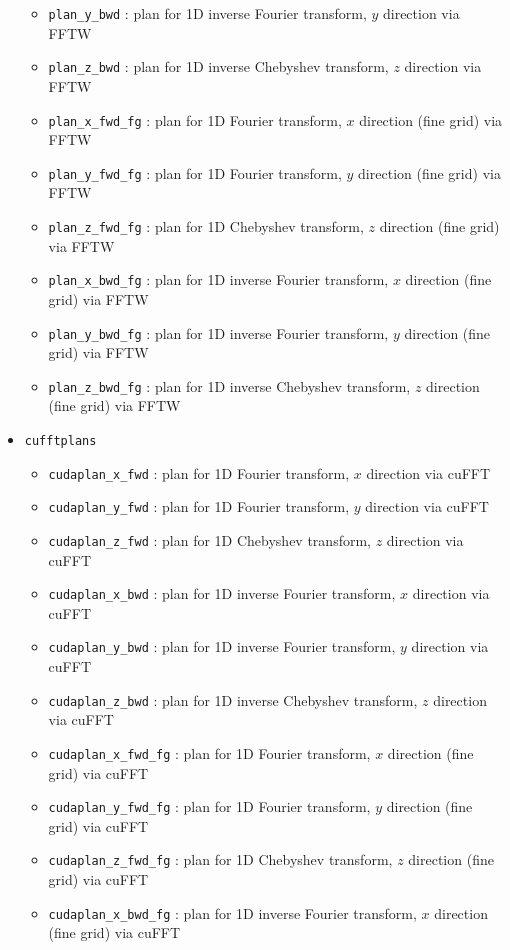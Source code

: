 \begin{itemize}
\begin{itemize}
\item \texttt{plan\_y\_bwd} : plan for 1D inverse Fourier transform, $y$ direction via FFTW
\item \texttt{plan\_z\_bwd} : plan for 1D inverse Chebyshev transform, $z$ direction via FFTW
\item \texttt{plan\_x\_fwd\_fg} : plan for 1D Fourier transform, $x$ direction (fine grid) via FFTW
\item \texttt{plan\_y\_fwd\_fg} : plan for 1D Fourier transform, $y$ direction (fine grid) via FFTW
\item \texttt{plan\_z\_fwd\_fg} : plan for 1D Chebyshev transform, $z$ direction (fine grid) via FFTW
\item \texttt{plan\_x\_bwd\_fg} : plan for 1D inverse Fourier transform, $x$ direction (fine grid) via FFTW
\item \texttt{plan\_y\_bwd\_fg} : plan for 1D inverse Fourier transform, $y$ direction (fine grid) via FFTW
\item \texttt{plan\_z\_bwd\_fg} : plan for 1D inverse Chebyshev transform, $z$ direction (fine grid) via FFTW
\end{itemize}
\item \texttt{cufftplans}
\begin{itemize}
\item \texttt{cudaplan\_x\_fwd} : plan for 1D Fourier transform, $x$ direction via cuFFT
\item \texttt{cudaplan\_y\_fwd} : plan for 1D Fourier transform, $y$ direction via cuFFT
\item \texttt{cudaplan\_z\_fwd} : plan for 1D Chebyshev transform, $z$ direction via cuFFT
\item \texttt{cudaplan\_x\_bwd} : plan for 1D inverse Fourier transform, $x$ direction via cuFFT
\item \texttt{cudaplan\_y\_bwd} : plan for 1D inverse Fourier transform, $y$ direction via cuFFT
\item \texttt{cudaplan\_z\_bwd} : plan for 1D inverse Chebyshev transform, $z$ direction via cuFFT
\item \texttt{cudaplan\_x\_fwd\_fg} : plan for 1D Fourier transform, $x$ direction (fine grid) via cuFFT
\item \texttt{cudaplan\_y\_fwd\_fg} : plan for 1D Fourier transform, $y$ direction (fine grid) via cuFFT
\item \texttt{cudaplan\_z\_fwd\_fg} : plan for 1D Chebyshev transform, $z$ direction (fine grid) via cuFFT
\item \texttt{cudaplan\_x\_bwd\_fg} : plan for 1D inverse Fourier transform, $x$ direction (fine grid) via cuFFT

\end{itemize}
\end{itemize}
